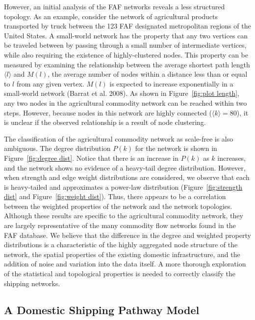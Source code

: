 \documentclass[12pt]{article}
\begin{document}
However, an initial analysis of the FAF networks reveals a less structured topology.  As an example, consider the network of agricultural products transported by truck between the 123 FAF designated metropolitan regions of the United States.  A small-world network has the property that any two vertices can be traveled between by passing through a small number of intermediate vertices, while also requiring the existence of highly-clustered nodes.  This property can be measured by examining the relationship between the average shortest path length $\big \langle l \big \rangle$ and $M(l)$, the average number of nodes within a distance less than or equal to $l$ from any given vertex.  $M(l)$ is expected to increase exponentially in a small-world network (Barrat et al. 2008).  As shown in Figure~\ref{fig:plot length}, any two nodes in the agricultural commodity network can be reached within two steps.  However, because nodes in this network are highly connected ($\big \langle k \big \rangle = 80$), it is unclear if the observed relationship is a result of node clustering.  

The classification of the agricultural commodity network as scale-free is also ambiguous.  The degree distribution $P(k)$ for the network is shown in Figure~\ref{fig:degree dist}.  Notice that there is an increase in $P(k)$ as $k$ increases, and the network shows no evidence of a heavy-tail degree distribution.  However, when strength and edge weight distributions are considered, we observe that each is heavy-tailed and approximates a power-law distribution (Figure~\ref{fig:strength dist} and Figure~\ref{fig:weight dist}).  Thus, there appears to be a correlation between the weighted properties of the network and the network topologies.  Although these results are specific to the agricultural commodity network, they are largely representative of the many commodity flow networks found in the FAF database.  We believe that the difference in the degree and weighted property distributions is a characteristic of the highly aggregated node structure of the network, the spatial properties of the existing domestic infrastructure, and the addition of noise and variation into the data itself. A more thorough exploration of the statistical and topological properties is needed to correctly classify the shipping networks.

\subsection*{A Domestic Shipping Pathway Model}
\end{document}

